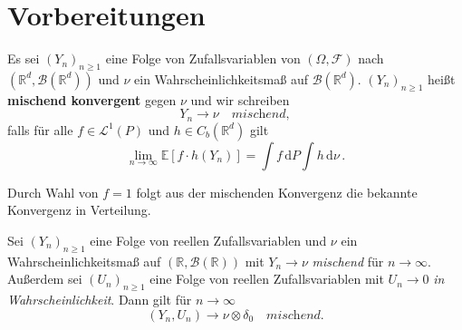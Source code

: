 \documentclass[ngerman,a4paper,11pt]{scrartcl}
\newcommand{\EE}{\mathbb{E}}
\newcommand{\RR}{\mathbb{R}}
\newcommand{\bb}{\mathcal{B}}
\newcommand{\ff}{\mathcal{F}}
\renewcommand{\ll}{\mathcal{L}}
\newcommand{\Cb}[1]{C_b(#1)}
\newcommand{\expect}[1]{\EE[#1]}
\newcommand{\dvar}[1]{\,\mathrm{d}#1}
\begin{document}
\section{Vorbereitungen}
\begin{defn}
  Es sei $(Y_n)_{n\geq 1}$ eine Folge von Zufallsvariablen von $(\Omega, \ff)$
  nach $(\RR^d, \bb(\RR^d))$ und $\nu$ ein Wahrscheinlichkeitsmaß auf
  $\bb(\RR^d)$. $(Y_n)_{n\geq 1}$ heißt \textbf{mischend konvergent} gegen $\nu$
  und wir schreiben
  \begin{equation*}
    Y_n\longrightarrow\nu \quad\textit{mischend}, 
  \end{equation*}
  falls für alle $f\in\ll^1(P)$ und $h\in\Cb{\RR^d}$ gilt
  \begin{equation*}
   \lim_{n\to\infty} \expect{f\cdot h(Y_n)} = \int f\dvar{P}\int h\dvar{\nu}\,.
  \end{equation*}
\end{defn}
\begin{rem}
 Durch Wahl von $f=1$ folgt aus der mischenden Konvergenz die bekannte
 Konvergenz in Verteilung. 
\end{rem}
\begin{lem}\label{lem:misch}
  Sei $(Y_n)_{n\geq 1}$ eine Folge von reellen Zufallsvariablen und $\nu$ ein
  Wahrscheinlichkeitsmaß auf $(\RR,\bb(\RR))$ mit $Y_n\to\nu$ \textit{mischend}
  für $n\to\infty$. Außerdem sei $(U_n)_{n\geq 1}$ eine Folge von reellen
  Zufallsvariablen mit $U_n\to 0$ \textit{in Wahrscheinlichkeit}. Dann gilt für $n\to\infty$
\begin{equation*}
 (Y_n,U_n)\to\nu\otimes\delta_0\quad\textit{mischend.}
\end{equation*}
\end{lem}
\end{document}
